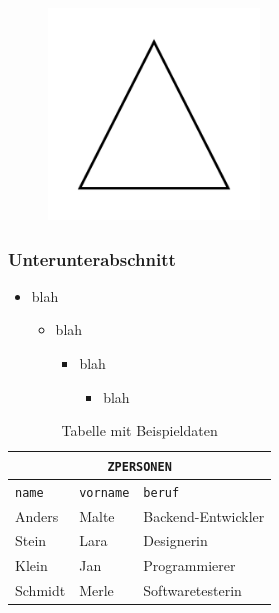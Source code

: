 \documentclass[             %
    final,                  %
    ngerman,                %
    paper=A4,               %
    paper=portrait,         %
    twoside,                %
    open=right,             %
    onecolumn,              %
    fontsize=11pt,          %
    BCOR=7.5mm,               %
    DIV=10,                 %
    titlepage=true,         %
    toc=bib,                %
    toc=idx,                %
    toc=listof,             %
    chapterentrydots=false, %
    numbers=noendperiod,    %
    captions=signature,     %
    captions=figuresignature,   %
    captions=tableheading,  %
    captions=nooneline,     %
    bibliography=openstyle, %
    automark                %
]{scrbook}                  %
\begin{document}
\begin{figure}[H]
    \centering
    \includegraphics[width=0.5\textwidth]{test.png}
    \caption{\blindtext}
    \label{fig:my_label}
\end{figure}
\subsubsection{Unterunterabschnitt}
\blindtext %
\begin{itemize}
    \item blah
    \begin{itemize}
        \item blah
        \begin{itemize}
            \item blah
            \begin{itemize}
                \item blah
            \end{itemize}
        \end{itemize}
    \end{itemize}
\end{itemize}
\blindtext \cite{gon}
\begin{table}[H]
    \centering
    \begin{tabular}{|l|l|l|}
        \hline
        \multicolumn{3}{|c|}{\texttt{ZPERSONEN}}\\\hline
        \texttt{name} & \texttt{vorname} & \texttt{beruf}\\\hline
        Anders & Malte & Backend-Entwickler\\
        Stein & Lara & Designerin\\
        Klein & Jan & Programmierer\\
        Schmidt & Merle & Softwaretesterin\\\hline
    \end{tabular}
    \captionsetup{type=table,font=small,labelfont=bf,skip=0pt} %
    \setlength{\abovecaptionskip}{10pt} %
    \setlength{\belowcaptionskip}{15pt} %
    \caption{Tabelle mit Beispieldaten}
    \label{table:personen}
\end{table}
\end{document}

